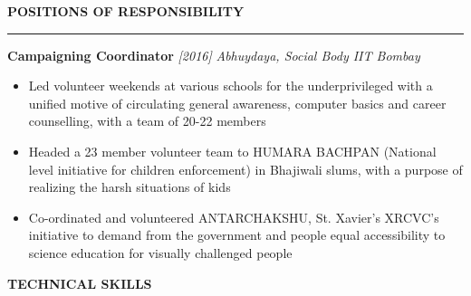 \documentclass[10 pt]{article}%
\begin{document}
{{{{{{{{\begin{flushleft}\bf{\large{POSITIONS OF RESPONSIBILITY}}\end{flushleft}
\vspace{-1mm}
\hrule
\vspace{1 pt}
{\flushleft \textbf {\large{Campaigning Coordinator}} \hfill {{{\em{[2016]}}}}
	\vspace{-0.8em}
	{\flushleft \em{Abhuydaya, Social Body IIT Bombay}}
	\vspace{-5pt}
	\begin{itemize}[leftmargin=*]
		\setlength\itemsep{1.5pt}
		\setlength\parskip{1.5pt}
		\item Led volunteer weekends at various schools for the underprivileged with a unified motive of circulating general awareness, computer basics and career counselling, with a team of 20-22 members
		\item Headed a 23 member volunteer team to HUMARA BACHPAN (National level initiative for children enforcement) in Bhajiwali slums, with a purpose of realizing the harsh situations of kids
		\item Co-ordinated and volunteered ANTARCHAKSHU, St. Xavier’s XRCVC’s initiative to demand from the government and people equal accessibility to science education for visually challenged people
	\end{itemize}
\begin{flushleft}\bf{\large{TECHNICAL SKILLS}}\end{flushleft}
}}}}}}}}}
\end{document}
